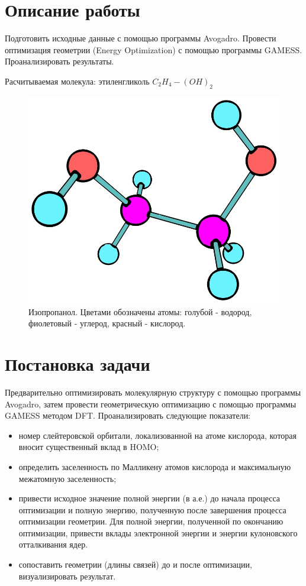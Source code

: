 \section{Описание работы}
Подготовить исходные данные с помощью программы Avogadro. Провести оптимизация геометрии (Energy Optimization) с помощью программы GAMESS. Проанализировать результаты.

Расчитываемая молекула: этиленгликоль $C_2H_4 - (OH)_2$

\begin{figure}[H]
\centering
\captionsetup{justification=centering}
\includegraphics[scale=0.4]{fig/0.jpg}
\caption{Изопропанол. Цветами обозначены атомы: голубой - водород, фиолетовый - углерод, красный - кислород.}
\end{figure}

\newpage
\section{Постановка задачи}
Предварительно оптимизировать молекулярную структуру с помощью программы Avogadro, затем провести геометрическую оптимизацию с помощью программы GAMESS методом DFT. Проанализировать следующие показатели: 
\begin{itemize}
    \item номер слейтеровской орбитали, локализованной на атоме кислорода, которая вносит существенный вклад в HOMO;
    \item определить заселенность по Малликену атомов кислорода и максимальную межатомную заселенность;
    \item привести исходное значение полной энергии (в а.е.) до начала процесса оптимизации и полную энергию, полученную после завершения процесса оптимизации геометрии. Для полной энергии, полученной по окончанию оптимизации, привести вклады электронной энергии и энергии кулоновского отталкивания ядер.
    \item сопоставить геометрии (длины связей) до и после оптимизации, визуализировать результат.
\end{itemize}

